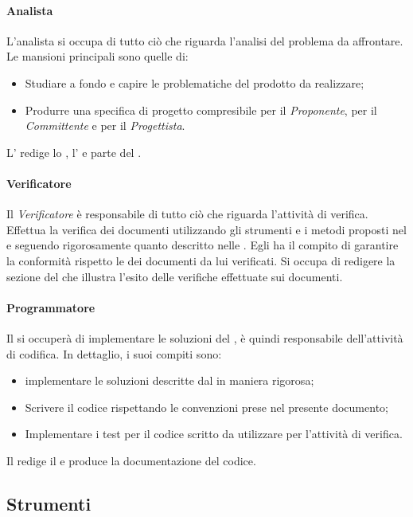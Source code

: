 \paragraph{Analista}
L'analista si occupa di tutto ciò che riguarda l'analisi del problema da 
affrontare. Le mansioni principali sono quelle di:
\begin{itemize}
  \item Studiare a fondo e capire le problematiche del prodotto da realizzare;
  \item Produrre una specifica di progetto compresibile per il 
  \textsl{Proponente}, per il \textsl{Committente} e per il 
  \textsl{Progettista}.
\end{itemize}
L'\textsl{\Ana} redige lo \textsl{\SdF}, l'\textsl{\AdR} e parte del 
\textsl{\PdQ}.

\paragraph{Verificatore}
Il \textsl{Verificatore} è responsabile di tutto ciò che riguarda l'attività di verifica.
Effettua la verifica dei documenti utilizzando gli strumenti e i metodi proposti nel 
\textsl{\PdQ} e seguendo rigorosamente quanto descritto nelle \textsl{\NdP}.
Egli ha il compito di garantire la conformità rispetto le \textsl{\NdP} dei documenti da lui verificati. 
Si occupa di redigere la sezione del \textsl{\PdQ} che illustra l'esito delle 
verifiche effettuate sui documenti.

\paragraph{Programmatore}
Il \textsl{\Progr} si occuperà di implementare le soluzioni del \textsl{\Prog}, è quindi 
responsabile dell'attività di codifica. In dettaglio, i suoi compiti sono:
\begin{itemize}
  \item implementare le soluzioni descritte dal \textsl{\Prog} in maniera 
  rigorosa;
  \item Scrivere il codice rispettando le convenzioni prese nel presente 
  documento;
  \item Implementare i test per il codice scritto da utilizzare per l'attività 
  di verifica.
\end{itemize}
Il \textsl{\Progr} redige il \textsl{\MU} e produce la documentazione del codice.

\subsection{Strumenti}

